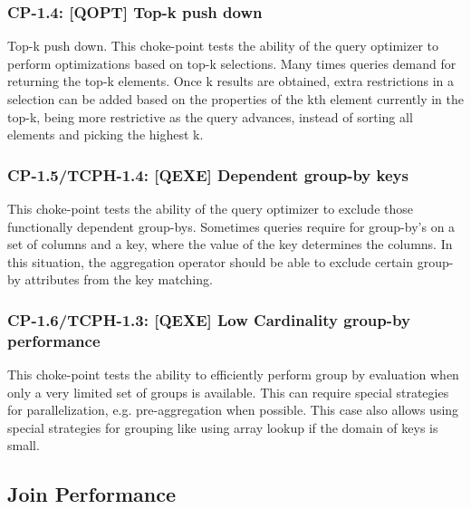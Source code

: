 \subsubsection{CP-1.4: [QOPT]  Top-k push down}
\label{choke_point_1.4}
Top-k push down. This choke-point tests the ability of the query optimizer to perform optimizations based on top-k selections. Many times queries demand for returning the top-k elements.
Once k results are obtained, extra restrictions in a selection can be added based on the properties of the kth element currently in the top-k, being more restrictive as the query advances, instead of sorting all elements and picking the highest k.

\subsubsection{CP-1.5/TCPH-1.4: [QEXE] Dependent group-by keys}
\label{choke_point_1.5}
This choke-point tests the ability of the query optimizer to exclude those functionally dependent group-bys. Sometimes queries require for group-by's on a set of columns and a key, where the value of the key determines the columns.
In this situation, the aggregation operator should be able to exclude certain group-by attributes from the key matching.

\subsubsection{CP-1.6/TCPH-1.3: [QEXE] Low Cardinality group-by performance}
\label{choke_point_1.6}
This choke-point tests the ability to efficiently perform group by evaluation when only a very limited set of groups is available.  This can require special strategies for parallelization, e.g. pre-aggregation when possible. This case also allows using special strategies for grouping like using array lookup if the domain of keys is small.


\subsection{Join Performance}

